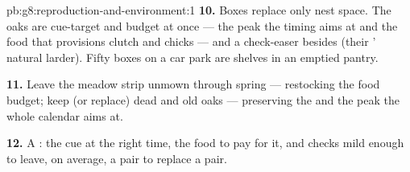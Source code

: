 \begin{solution}{pb:g8:reproduction-and-environment:1}
\textbf{10.} Boxes replace only nest space. The oaks are
cue-target and budget at once --- the  peak
the timing aims at and the food that provisions clutch
and chicks --- and a check-easer besides (their '
natural larder). Fifty boxes on a car park are shelves
in an emptied pantry.

\textbf{11.} Leave the meadow strip unmown through
spring --- restocking the food budget; keep (or replace)
dead  and old oaks --- preserving the  and
the peak the whole calendar aims at.

\textbf{12.} A : the cue at the right time, the
food to pay for it, and checks mild enough to leave, on
average, a pair to replace a pair.
\end{solution}

